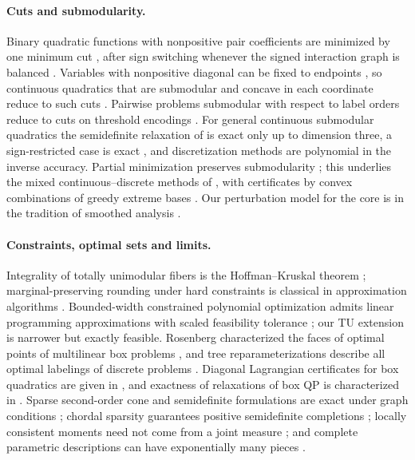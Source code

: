 \paragraph{Cuts and submodularity.}
Binary quadratic functions with nonpositive pair coefficients are minimized by
one minimum cut \cite{Ivanescu1965,PicardRatliff1975,BorosHammer2002,
KolmogorovZabih2004}, after sign switching whenever the signed interaction
graph is balanced \cite{Harary1953,HammerHansenSimeone1984,Padberg1989}.
Variables with nonpositive diagonal can be fixed to endpoints
\cite{Rosenberg1972,DelPiaKhajavirad2026,Khajavirad2026PolyBox}, so continuous
quadratics that are submodular and concave in each coordinate reduce to such
cuts \cite{BurerNatarajanWillemsen2026v3}. Pairwise problems submodular with
respect to label orders reduce to cuts on threshold encodings
\cite{SchlesingerFlach2006,Ishikawa2003,Hochbaum2001}. For general continuous
submodular quadratics the semidefinite relaxation of
\cite{BurerNatarajanWillemsen2026v3} is exact only up to dimension three, a
sign-restricted case is exact \cite{KimKojima2003}, and discretization methods
\cite{Bach2019,Bach2018Isotonic,AxelrodLiuSidford2020} are polynomial in the
inverse accuracy. Partial minimization preserves submodularity
\cite{Topkis1978,Topkis1998}; this underlies the mixed continuous--discrete
methods of \cite{GomezHan2025,BuntonTabuada2022}, with certificates by convex
combinations of greedy extreme bases
\cite{Edmonds1970,Cunningham1985,IwataFleischerFujishige2001}. Our perturbation
model for the core is in the tradition of smoothed analysis
\cite{SpielmanTeng2004,BeierVocking2006,RoglinVocking2007}.

\paragraph{Constraints, optimal sets and limits.}
Integrality of totally unimodular fibers is the Hoffman--Kruskal theorem
\cite{HoffmanKruskal1956,Schrijver1986}; marginal-preserving rounding under hard
constraints is classical in approximation algorithms
\cite{GandhiEtAl2006,ChekuriVondrakZenklusen2010}. Bounded-width constrained
polynomial optimization admits linear programming approximations with scaled
feasibility tolerance \cite{BienstockMunoz2018}; our TU extension is narrower but
exactly feasible. Rosenberg characterized the faces of optimal points of
multilinear box problems \cite{Rosenberg1972}, and tree reparameterizations
describe all optimal labelings of discrete problems
\cite{WainwrightJaakkolaWillsky2005,Werner2007}. Diagonal Lagrangian certificates
for box quadratics are given in \cite{BeckTeboulle2000,JeyakumarRubinovWu2006,
LiWuQuan2015}, and exactness of relaxations of box QP is characterized in
\cite{QiuYildirim2024}. Sparse second-order cone and semidefinite formulations
are exact under graph conditions \cite{DeyKhajavirad2026,Khajavirad2026SparseSDP};
chordal sparsity guarantees positive semidefinite completions
\cite{GroneEtAl1984,VandenbergheAndersen2015}; locally consistent moments need not
come from a joint measure \cite{SheraliAdams1990,WainwrightJordan2008}; and
complete parametric descriptions can have exponentially many pieces
\cite{Murty1980,MairalYu2012,GartnerJaggiMaria2012}.
